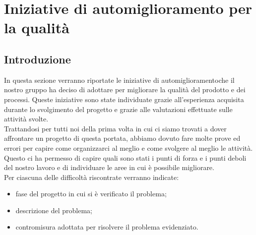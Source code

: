 \section{Iniziative di automiglioramento per la qualità}
\subsection{Introduzione}
In questa sezione verranno riportate le iniziative di automiglioramentoche il nostro gruppo ha deciso di adottare per migliorare la qualità del prodotto e dei processi. Queste iniziative sono state individuate grazie all'esperienza acquisita durante lo svolgimento del progetto e grazie alle valutazioni effettuate sulle attività svolte. \\
Trattandosi per tutti noi della prima volta in cui ci siamo trovati a dover affrontare un progetto di questa portata, abbiamo dovuto fare molte prove ed errori per capire come organizzarci al meglio e come svolgere al meglio le attività. Questo ci ha permesso di capire quali sono stati i punti di forza e i punti deboli del nostro lavoro e di individuare le aree in cui è possibile migliorare. \\
Per ciascuna delle difficoltà riscontrate verranno indicate:
\begin{itemize}
    \item fase del progetto in cui si è verificato il problema;
    \item descrizione del problema;
    \item contromisura adottata per risolvere il problema evidenziato.
\end{itemize}


